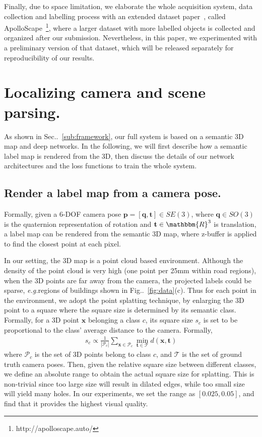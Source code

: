 \documentclass[10pt,twocolumn,letterpaper]{article}
\makeatletter
\newcommand{\figref}[1]{Fig\onedot~\ref{#1}}
\newcommand{\secref}[1]{Sec\onedot~\ref{#1}}
\newcommand{\ve}[1]{{\mathbf #1}} %
\newcommand{\hua}[1]{{\mathcal #1}}
\DeclareRobustCommand\onedot{\futurelet\@let@token\@onedot}
\def\onedot{\ifx\@let@token.\else.\null\fi\xspace}
\def\eg{\emph{e.g.}}
\makeatother
\begin{document}
Finally, due to space limitation, we elaborate the whole acquisition system, data collection and labelling process with an extended dataset paper~\cite{huang2018cvprw}, called ApolloScape~\footnote{http://apolloscape.auto/}, where a larger dataset with more labelled objects is collected and organized after our submission. 
Nevertheless, in this paper, we experimented with a preliminary version of that dataset, which will be released separately for reproducibility of our results.


\vspace{-0.5\baselineskip}\section{Localizing camera and scene parsing.}\vspace{-0.3\baselineskip}\label{sec:localize_and_parsing}
As shown in \secref{sub:framework}, our full system is based on a semantic 3D map and deep networks. In the following, we will first describe how a semantic label map is rendered from the 3D, then discuss the details of our network architectures and the loss functions to train the whole system.

\subsection{Render a label map from a camera pose.}\label{sub:render}
Formally, given a 6-DOF camera pose $\ve{p} = [\ve{q}, \ve{t}] \in SE(3)$, where $\ve{q} \in SO(3)$ is the quaternion representation of rotation and $\ve{t} \in \mathbbm{R}^3$ is translation, a label map can be rendered from the semantic 3D map, where z-buffer is applied to find the closest point at each pixel.

In our setting, the 3D map is a point cloud based environment. 
Although the density of the point cloud is very high (one point per 25mm within road regions), when the 3D points are far away from the camera, the projected labels could be sparse, \eg regions of buildings shown in \figref{fig:data}(c).
Thus for each point in the environment, we adopt the point splatting technique, by enlarging the 3D point to a square where the square size is determined by its semantic class. Formally, for a 3D point $\ve{x}$ belonging a class $c$, its square size $s_c$ is set to be proportional to the class' average distance to the camera. Formally,
{\vspace{-0.3\baselineskip}
\begin{align}
\label{eq:square_size}
s_c \propto \frac{1}{|\hua{P}_c|}\sum_{\ve{x}\in \hua{P}_c} \min_{\ve{t}\in\hua{T}} d(\ve{x}, \ve{t})
\end{align}
}
where $\hua{P}_c$ is the set of 3D points belong to class $c$, and $\hua{T}$ is the set of ground truth camera poses. 
Then, given the relative square size between different classes, we define an absolute range to obtain the actual square size for splatting. This is non-trivial since too large size will result in dilated edges, while too small size will yield many holes. In our experiments, we set the range as $[0.025, 0.05]$, and find that it provides the highest visual quality.
\end{document}
